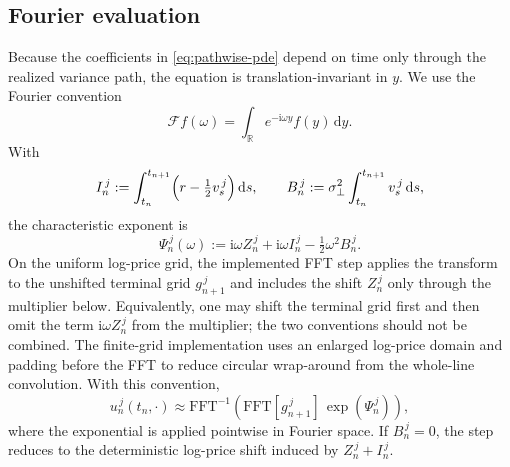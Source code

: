 \documentclass[pdflatex,sn-mathphys-num]{sn-jnl}
\theoremstyle{thmstyleone}%
\theoremstyle{thmstylethree}%
\theoremstyle{thmstyletwo}%
\newcommand{\dd}{\mathrm d}
\begin{document}
\subsection{Fourier evaluation}
Because the coefficients in \eqref{eq:pathwise-pde} depend on time only through the realized variance path, the equation is translation-invariant in $y$. We use the Fourier convention
\[
\mathcal F f(\omega)=\int_{\mathbb R}e^{-\mathrm i\omega y}f(y)\,\dd y.
\]
With
\[
I_n^{\,j}:=\int_{t_n}^{t_{n+1}}\Bigl(r-\tfrac12 v_s^{\,j}\Bigr)\,\dd s,
\qquad
B_n^{\,j}:=\sigma_\perp^2\int_{t_n}^{t_{n+1}}v_s^{\,j}\,\dd s,
\]
the characteristic exponent is
\[
\Psi_n^{\,j}(\omega)
:=\mathrm i\omega Z_n^{\,j}+\mathrm i\omega I_n^{\,j}
-\tfrac12\omega^2B_n^{\,j}.
\]
On the uniform log-price grid, the implemented FFT step applies the transform to the unshifted terminal grid
$g_{n+1}^{\,j}$ and includes the shift $Z_n^{\,j}$ only through the multiplier below. Equivalently, one may shift
the terminal grid first and then omit the term $\mathrm i\omega Z_n^{\,j}$ from the multiplier; the two
conventions should not be combined. The finite-grid implementation uses an enlarged log-price domain and padding
before the FFT to reduce circular wrap-around from the whole-line convolution. With this convention,
\begin{equation}
u_n^{\,j}(t_n,\cdot)
\approx
\mathrm{FFT}^{-1}\!\left(
\mathrm{FFT}[g_{n+1}^{\,j}]\,\exp(\Psi_n^{\,j})
\right),
\label{eq:fft-recursion}
\end{equation}
where the exponential is applied pointwise in Fourier space. If $B_n^{\,j}=0$, the step reduces to the deterministic log-price shift induced by $Z_n^{\,j}+I_n^{\,j}$.
\end{document}
